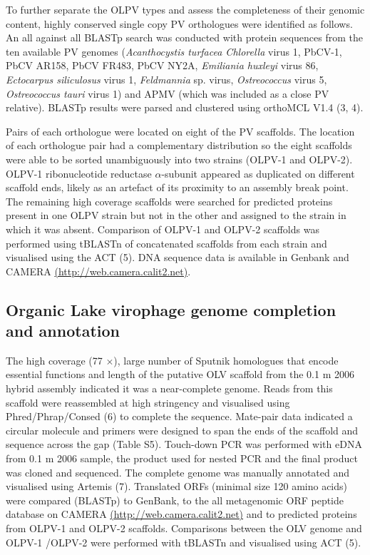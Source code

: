 To further separate the \ac{OLPV} types and assess the completeness of their genomic content, highly conserved single copy PV orthologues were identified as follows. 
An all against all \ac{BLAST}p search was conducted with protein sequences from the ten available \ac{PV} genomes 
(\emph{Acanthocystis turfacea Chlorella} virus 1, PbCV-1, PbCV AR158, PbCV FR483, PbCV NY2A, \emph{Emiliania huxleyi} virus 86, \emph{Ectocarpus siliculosus} virus 1, \emph{Feldmannia} sp. virus, \emph{Ostreococcus} virus 5, \emph{Ostreococcus tauri} virus 1) and \ac{APMV} (which was included as a close \ac{PV} relative). 
\ac{BLAST}p results were parsed and clustered using ortho\textsc{MCL} V1.4 (3, 4). 

Pairs of each orthologue were located on eight of the \ac{PV} scaffolds. 
The location of each orthologue pair had a complementary distribution so the eight scaffolds were able to be sorted unambiguously into two strains (\ac{OLPV}-1 and \ac{OLPV}-2). 
\ac{OLPV}-1 ribonucleotide reductase $\alpha$-subunit appeared as duplicated on different scaffold ends, likely as an artefact of its proximity to an assembly break point. 
The remaining high coverage scaffolds were searched for predicted proteins present in one OLPV strain but not in the other and assigned to the strain in which it was absent. 
Comparison of \ac{OLPV}-1 and \ac{OLPV}-2 scaffolds was performed using tBLASTn of concatenated scaffolds from each strain and visualised using the \ac{ACT} (5). 
\textsc{DNA} sequence data is available in Genbank and \ac{CAMERA} \url{(http://web.camera.calit2.net)}.

\subsection[Genome completion and annotation]{Organic Lake virophage genome completion and annotation}
The high coverage (77 $\times$), large number of Sputnik homologues that encode essential functions and length of the putative OLV scaffold from the 0.1 \textmu{}m 2006 hybrid assembly indicated it was a near-complete genome. 
Reads from this scaffold were reassembled at high stringency and visualised using Phred/Phrap/Consed (6) to complete the sequence. 
Mate-pair data indicated a circular molecule and primers were designed to span the ends of the scaffold and sequence across the gap (Table S5). 
Touch-down PCR was performed with eDNA from 0.1 \textmu{}m 2006 sample, the product used for nested PCR and the final product was cloned and sequenced. 
The complete genome was manually annotated and visualised using Artemis (7). 
Translated ORFs (minimal size 120 amino acids) were compared (BLASTp) to GenBank, to the all metagenomic ORF peptide database on CAMERA \url{(http://web.camera.calit2.net)} and to predicted proteins from OLPV-1 and OLPV-2 scaffolds. 
Comparisons between the OLV genome and OLPV-1 /OLPV-2 were performed with tBLASTn and visualised using ACT (5). 

